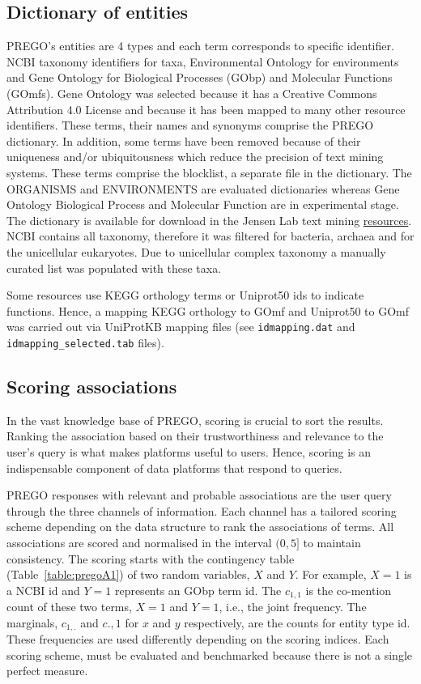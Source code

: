\subsection{Dictionary of entities}
\label{subsec:prego-dict}

PREGO's entities are 4 types and each term corresponds to specific identifier. 
NCBI taxonomy identifiers for taxa, Environmental Ontology for environments and
Gene Ontology for Biological Processes (GObp) and Molecular Functions (GOmfs).
Gene Ontology was selected because it has a Creative Commons Attribution 4.0 License
and because it has been mapped to many other resource identifiers.
These terms, their names and synonyms comprise the PREGO dictionary. In addition,
some terms have been removed because of their uniqueness and/or ubiquitousness which reduce the precision of text mining systems.
These terms comprise the blocklist, a separate file in the dictionary.
The ORGANISMS \parencite{pafilis2013species} and ENVIRONMENTS \parencite{pafilis2015environments} are evaluated dictionaries
whereas Gene Ontology Biological Process and Molecular Function are in experimental stage.
The dictionary is 
available for download in the Jensen Lab text mining \href{https://jensenlab.org/resources/textmining/#dictionaries}{resources}. 
NCBI contains all taxonomy, therefore it was filtered for bacteria, archaea and
for the unicellular eukaryotes. Due to unicellular complex taxonomy a manually curated
list was populated with these taxa.

Some resources use KEGG orthology terms or Uniprot50 ids to indicate functions. 
Hence, a mapping KEGG orthology to GOmf and Uniprot50 to GOmf was carried out via UniProtKB mapping files (see \texttt{idmapping.dat} and \texttt{idmapping\_selected.tab} files). 

\subsection{Scoring associations}
\label{scoring}

In the vast knowledge base of PREGO, scoring is crucial to sort 
the results. Ranking the association based on their trustworthiness and
relevance to the user's query is what makes platforms useful to users.
Hence, scoring is an indispensable component of data platforms 
that respond to queries.

PREGO responses with relevant and probable associations are the user query
through the three channels of information. 
Each channel has a tailored scoring scheme depending on the data structure to
rank the associations of terms.
All associations are scored and normalised in the interval $(0,5]$ to maintain consistency. 
The scoring starts with the contingency table (Table~\ref{table:pregoA1}) of two random variables, $X$ and $Y$.
For example, $X = 1$ is a NCBI id and $Y = 1$ represents an GObp term id. 
The $c_{1,1}$ is the co-mention count of these two terms, $X = 1$ and $Y = 1$, i.e., the joint frequency. 
The marginals, $c_{1,.}$ and $c{.,1}$ for $x$ and $y$ respectively, are the counts for entity type id. 
These frequencies are used differently depending on the scoring indices.
Each scoring scheme, must be evaluated and benchmarked because there is not a 
single perfect measure. 


